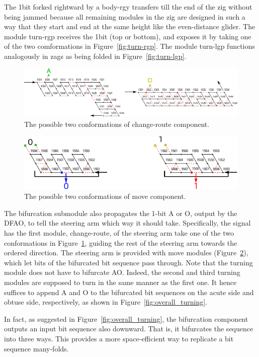 The 1bit forked rightward by a body-rgy transfers till the end of the zig without being jammed because all remaining modules in the zig are designed in such a way that they start and end at the same height like the even-distance glider.
The module turn-rgp receives the 1bit (top or bottom), and exposes it by taking one of the two comformations in Figure~\ref{fig:turn-rgp}.
The module turn-lgp functions analogously in zags as being folded in Figure~\ref{fig:turn-lgp}.

\begin{figure}[h]
\centering
\includegraphics[width=\linewidth]{pic/change_route.pdf}
\caption{The possible two conformations of change-route component.}
\label{fig:change_route}
\end{figure}

\begin{figure}[h]
\centering
\includegraphics[width=\linewidth]{pic/move.pdf}
\caption{The possible two conformations of move component.}
\label{fig:move}
\end{figure}

The bifurcation submodule also propagates the 1-bit A or O, output by the DFAO, to tell the steering arm which way it should take.
Specifically, the signal has the first module, change-route, of the steering arm take one of the two conformations in Figure~\ref{fig:change_route}, guiding the rest of the steering arm towards the ordered direction.
The steering arm is provided with move modules (Figure~\ref{fig:move}), which let bits of the bifurcated bit sequence pass through.  
Note that the turning module does not have to bifurcate AO.
Indeed, the second and third turning modules are supposed to turn in the same manner as the first one.
It hence suffices to append A and O to the bifurcated bit sequences on the acute side and obtuse side, respectively, as shown in Figure~\ref{fig:overall_turning}.

\begin{remark}
In fact, as suggested in Figure~\ref{fig:overall_turning}, the bifurcation component outputs an input bit sequence also downward.
That is, it bifurcates the sequence into three ways.
This provides a more space-efficient way to replicate a bit sequence many-folds.
\end{remark}

